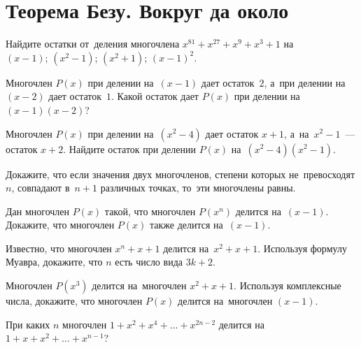 
\section*{Теорема Безу. Вокруг да около}


\begin{problems}

\item
Найдите остатки от~деления многочлена $x^{81} + x^{27} + x^9 + x^3 + 1$ на%
\\
\subproblem $(x - 1)$;
\qquad
\subproblem $(x^2 - 1)$;
\qquad
\subproblem $(x^2 + 1)$;
\qquad
\subproblem $(x - 1)^2$.

\item
Многочлен $P(x)$ при делении на~$(x - 1)$ дает остаток~$2$, а~при делении
на~$(x - 2)$ дает остаток~$1$.
Какой остаток дает $P(x)$ при делении на~$(x - 1) (x - 2)$?

\item
Многочлен $P(x)$ при делении на~$(x^2 - 4)$ дает остаток $x + 1$,
а~на~$x^2 - 1$~--- остаток $x + 2$.
Найдите остаток при делении $P(x)$ на~$(x^2 - 4) (x^2 - 1)$.

\item
Докажите, что если значения двух многочленов, степени которых
не~превосходят $n$, совпадают в~$n + 1$ различных точках, то~эти многочлены
равны.

\item
Дан многочлен $P(x)$ такой, что многочлен $P(x^{n})$ делится на~$(x - 1)$.
Докажите, что многочлен $P(x)$ также делится на~$(x - 1)$.

\item
Известно, что многочлен $x^{n} + x + 1$ делится на~$x^2 + x + 1$.
Используя формулу Муавра, докажите, что $n$ есть число вида $3 k + 2$.

\item
Многочлен $P(x^3)$ делится на~многочлен $x^2 + x + 1$.
Используя комплексные числа, докажите, что многочлен $P(x)$ делится
на~многочлен $(x - 1)$.

\item
При каких $n$ многочлен $1 + x^2 + x^4 + \ldots + x^{2n-2}$ делится
на~$1 + x + x^2 + \ldots + x^{n-1}$?

\end{problems}

